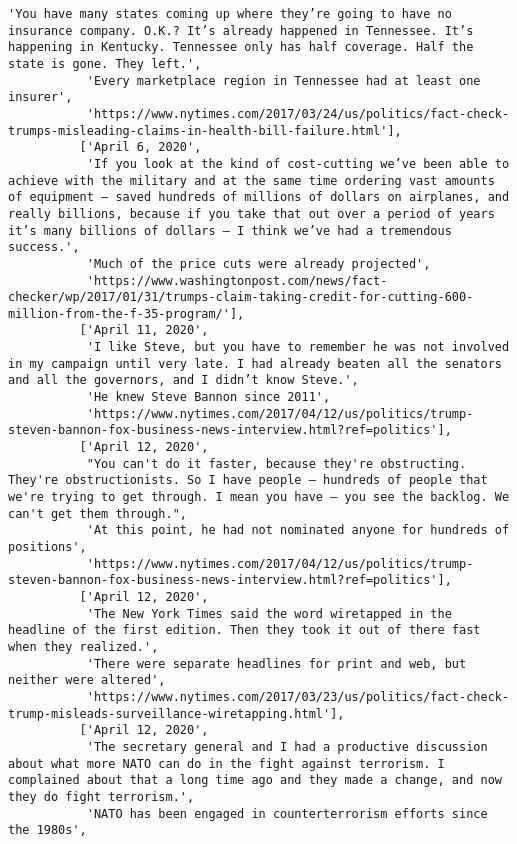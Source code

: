 \documentclass[11pt]{article}
\begin{document}
\begin{Verbatim}[commandchars=\\\{\}]
           'You have many states coming up where they’re going to have no insurance company. O.K.? It’s already happened in Tennessee. It’s happening in Kentucky. Tennessee only has half coverage. Half the state is gone. They left.',
           'Every marketplace region in Tennessee had at least one insurer',
           'https://www.nytimes.com/2017/03/24/us/politics/fact-check-trumps-misleading-claims-in-health-bill-failure.html'],
          ['April 6, 2020',
           'If you look at the kind of cost-cutting we’ve been able to achieve with the military and at the same time ordering vast amounts of equipment — saved hundreds of millions of dollars on airplanes, and really billions, because if you take that out over a period of years it’s many billions of dollars — I think we’ve had a tremendous success.',
           'Much of the price cuts were already projected',
           'https://www.washingtonpost.com/news/fact-checker/wp/2017/01/31/trumps-claim-taking-credit-for-cutting-600-million-from-the-f-35-program/'],
          ['April 11, 2020',
           'I like Steve, but you have to remember he was not involved in my campaign until very late. I had already beaten all the senators and all the governors, and I didn’t know Steve.',
           'He knew Steve Bannon since 2011',
           'https://www.nytimes.com/2017/04/12/us/politics/trump-steven-bannon-fox-business-news-interview.html?ref=politics'],
          ['April 12, 2020',
           "You can't do it faster, because they're obstructing. They're obstructionists. So I have people — hundreds of people that we're trying to get through. I mean you have — you see the backlog. We can't get them through.",
           'At this point, he had not nominated anyone for hundreds of positions',
           'https://www.nytimes.com/2017/04/12/us/politics/trump-steven-bannon-fox-business-news-interview.html?ref=politics'],
          ['April 12, 2020',
           'The New York Times said the word wiretapped in the headline of the first edition. Then they took it out of there fast when they realized.',
           'There were separate headlines for print and web, but neither were altered',
           'https://www.nytimes.com/2017/03/23/us/politics/fact-check-trump-misleads-surveillance-wiretapping.html'],
          ['April 12, 2020',
           'The secretary general and I had a productive discussion about what more NATO can do in the fight against terrorism. I complained about that a long time ago and they made a change, and now they do fight terrorism.',
           'NATO has been engaged in counterterrorism efforts since the 1980s',

\end{Verbatim}
\end{document}

